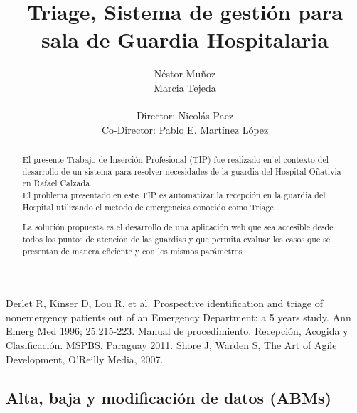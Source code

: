 \documentclass[a4paper,10pt]{article}
\title{Triage, Sistema de gestión para sala de Guardia Hospitalaria}
\author{Néstor Muñoz\\ Marcia Tejeda\\ \\ Director: Nicolás Paez \\  Co-Director: Pablo E. Martínez López}
\begin{document}
\maketitle
\newpage
\newpage 
\begin{abstract}
El presente Trabajo de Inserción Profesional (TIP) fue realizado en el contexto del desarrollo de un sistema para resolver necesidades de la guardia del Hospital Oñativia en Rafael Calzada.\\ 
El problema presentado en este TIP es automatizar la recepción en la guardia del Hospital utilizando el método de emergencias conocido como Triage.
 
La solución propuesta es el desarrollo de una aplicación web que sea accesible desde todos los puntos de atención de las guardias y que permita evaluar los casos que se presentan de manera eficiente y con los mismos parámetros.

\end{abstract}


\newpage 
\tableofcontents

\newpage


















\newpage 
\begin{thebibliography}{3} 
 Derlet R, Kinser D, Lou R, et al. Prospective identification and triage of nonemergency patients out of an Emergency Department: a 5 years study. Ann Emerg Med 1996; 25:215-223.
 Manual de procedimiento. Recepción,  Acogida y Clasificación.  MSPBS. Paraguay 2011.
 Shore J, Warden S, The Art of Agile Development, O’Reilly Media, 2007.

\end{thebibliography}

\newpage
\appendix

\subsection{Alta, baja y modificación de datos (ABMs)}


\newpage


 
\end{document}
